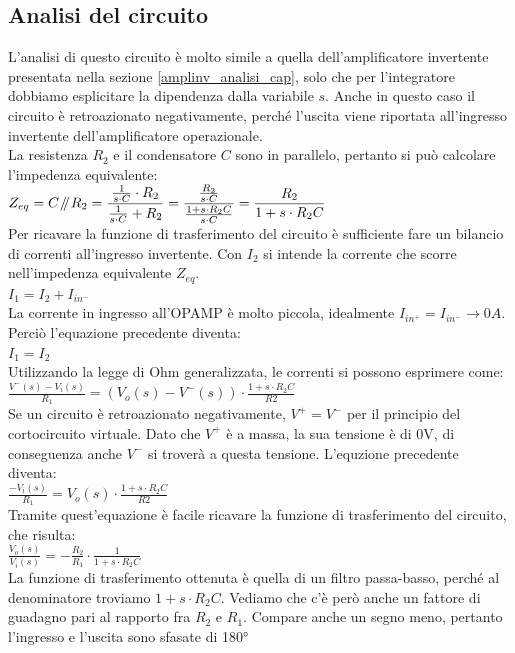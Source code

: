 \documentclass{report}
\newcommand{\parallelsum}{\mathbin{\!/\mkern-5mu/\!}}
\begin{document}
\subsection{Analisi del circuito} 
L'analisi di questo circuito è molto simile a quella dell'amplificatore invertente presentata nella sezione \ref{amplinv_analisi_cap}, solo che per l'integratore dobbiamo esplicitare la dipendenza dalla variabile $s$. Anche in questo caso il circuito è retroazionato negativamente, perché l'uscita viene riportata all'ingresso invertente dell'amplificatore operazionale. 
\\[2pt]La resistenza $R_2$ e il condensatore $C$ sono in parallelo, pertanto si può calcolare l'impedenza equivalente:
\\[2pt]\indent$\displaystyle{Z_{eq}=C\parallelsum R_2=\frac{\frac{1}{s\cdot C} \cdot R_2}{\frac{1}{s\cdot C} + R_2}=\frac{\frac{R_2}{s\cdot C}}{\frac{1+s\cdot R_2C}{s\cdot C}}=\frac{R_2}{1+s\cdot R_2C}}$
\\Per ricavare la funzione di trasferimento del circuito è sufficiente fare un bilancio di correnti all'ingresso invertente. Con $I_2$ si intende la corrente che scorre nell'impedenza equivalente $Z_{eq}$.
\\[2pt]\indent $I_1=I_2+I_{in^-}$
\\[2pt]La corrente in ingresso all'OPAMP è molto piccola, idealmente $I_{in^+}=I_{in^-}\rightarrow 0A$. Perciò l'equazione precedente diventa:
\\\indent $\displaystyle{I_1=I_2}$
\\Utilizzando la legge di Ohm generalizzata, le correnti si possono esprimere come:
\\[2pt]\indent $\displaystyle{\frac{V^-(s)-V_i(s)}{R_1}=(V_o(s)-V^-(s))\cdot\frac{1+s\cdot R_2C}{R2}}$
\\[2pt]Se un circuito è retroazionato negativamente, $V^+=V^-$ per il principio del cortocircuito virtuale. Dato che $V^+$ è a massa, la sua tensione è di 0V, di conseguenza anche $V^-$ si troverà a questa tensione. L'equzione precedente diventa:
\\[2pt]\indent $\displaystyle{\frac{-V_i(s)}{R_1}=V_o(s)\cdot\frac{1+s\cdot R_2C}{R2}}$
\\[2pt]Tramite quest'equazione è facile ricavare la funzione di trasferimento del circuito, che risulta:
\\[2pt]\indent $\displaystyle{\frac{V_o(s)}{V_i(s)}=-\frac{R_2}{R_1}\cdot\frac{1}{1+s\cdot R_2C}}$
\\[2pt]La funzione di trasferimento ottenuta è quella di un filtro passa-basso, perché al denominatore troviamo $1+s\cdot R_2C$. Vediamo che c'è però anche un fattore di guadagno pari al rapporto fra $R_2$ e $R_1$. Compare anche un segno meno, pertanto l'ingresso e l'uscita sono sfasate di 180°
\end{document}
